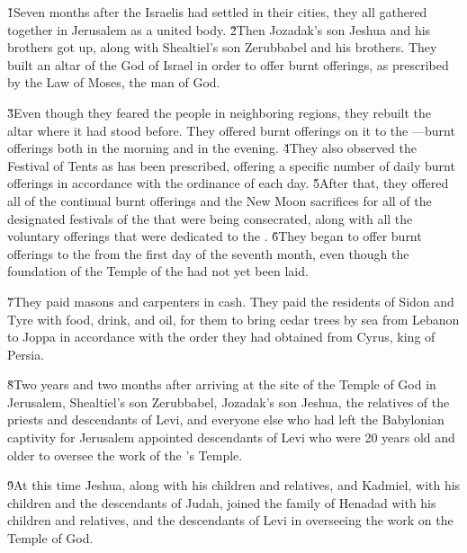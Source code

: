 \v{1}Seven months after the Israelis had settled in their cities, they all gathered together in Jerusalem as a united body. \v{2}Then Jozadak's son Jeshua and his brothers got up, along with Shealtiel's son Zerubbabel and his brothers. They built an altar of the God of Israel in order to offer burnt offerings, as prescribed by the Law of Moses, the man of God.

\v{3}Even though they feared the people in neighboring regions, they rebuilt the altar where it had stood before. They offered burnt offerings on it to the ---burnt offerings both in the morning and in the evening. \v{4}They also observed the Festival of Tents as has been prescribed, offering a specific number of daily burnt offerings in accordance with the ordinance of each day. \v{5}After that, they offered all of the continual burnt offerings and the New Moon sacrifices for all of the designated festivals of the  that were being consecrated, along with all the voluntary offerings that were dedicated to the . \v{6}They began to offer burnt offerings to the  from the first day of the seventh month, even though the foundation of the Temple of the  had not yet been laid.

\v{7}They paid masons and carpenters in cash. They paid the residents of Sidon and Tyre with food, drink, and oil, for them to bring cedar trees by sea from Lebanon to Joppa in accordance with the order they had obtained from Cyrus, king of Persia.

\v{8}Two years and two months after arriving at the site of the Temple of God in Jerusalem, Shealtiel's son Zerubbabel, Jozadak's son Jeshua, the relatives of the priests and descendants of Levi, and everyone else who had left the Babylonian captivity for Jerusalem appointed descendants of Levi who were 20 years old and older to oversee the work of the 's Temple.

\v{9}At this time Jeshua, along with his children and relatives, and Kadmiel, with his children and the descendants of Judah, joined the family of Henadad with his children and relatives, and the descendants of Levi in overseeing the work on the Temple of God.

